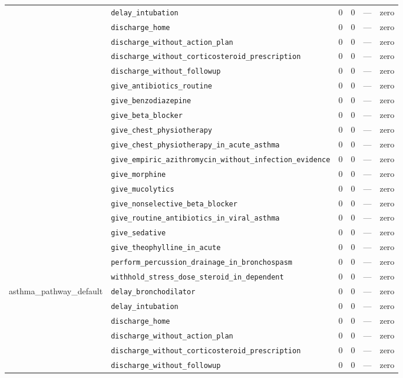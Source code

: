 \begin{table}[ht]
\begin{tabular}{llrrrl}
 & \texttt{delay\_intubation} & 0 & 0 & — & zero \\
 & \texttt{discharge\_home} & 0 & 0 & — & zero \\
 & \texttt{discharge\_without\_action\_plan} & 0 & 0 & — & zero \\
 & \texttt{discharge\_without\_corticosteroid\_prescription} & 0 & 0 & — & zero \\
 & \texttt{discharge\_without\_followup} & 0 & 0 & — & zero \\
 & \texttt{give\_antibiotics\_routine} & 0 & 0 & — & zero \\
 & \texttt{give\_benzodiazepine} & 0 & 0 & — & zero \\
 & \texttt{give\_beta\_blocker} & 0 & 0 & — & zero \\
 & \texttt{give\_chest\_physiotherapy} & 0 & 0 & — & zero \\
 & \texttt{give\_chest\_physiotherapy\_in\_acute\_asthma} & 0 & 0 & — & zero \\
 & \texttt{give\_empiric\_azithromycin\_without\_infection\_evidence} & 0 & 0 & — & zero \\
 & \texttt{give\_morphine} & 0 & 0 & — & zero \\
 & \texttt{give\_mucolytics} & 0 & 0 & — & zero \\
 & \texttt{give\_nonselective\_beta\_blocker} & 0 & 0 & — & zero \\
 & \texttt{give\_routine\_antibiotics\_in\_viral\_asthma} & 0 & 0 & — & zero \\
 & \texttt{give\_sedative} & 0 & 0 & — & zero \\
 & \texttt{give\_theophylline\_in\_acute} & 0 & 0 & — & zero \\
 & \texttt{perform\_percussion\_drainage\_in\_bronchospasm} & 0 & 0 & — & zero \\
 & \texttt{withhold\_stress\_dose\_steroid\_in\_dependent} & 0 & 0 & — & zero \\
\midrule
asthma\_pathway\_default & \texttt{delay\_bronchodilator} & 0 & 0 & — & zero \\
 & \texttt{delay\_intubation} & 0 & 0 & — & zero \\
 & \texttt{discharge\_home} & 0 & 0 & — & zero \\
 & \texttt{discharge\_without\_action\_plan} & 0 & 0 & — & zero \\
 & \texttt{discharge\_without\_corticosteroid\_prescription} & 0 & 0 & — & zero \\
 & \texttt{discharge\_without\_followup} & 0 & 0 & — & zero \\

\end{tabular}
\end{table}
